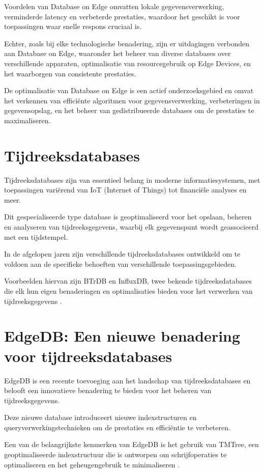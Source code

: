 Voordelen van Database on Edge omvatten lokale gegevensverwerking, verminderde latency en verbeterde prestaties, waardoor het geschikt is voor toepassingen waar snelle respons cruciaal is.

Echter, zoals bij elke technologische benadering, zijn er uitdagingen verbonden aan Database on Edge, waaronder het beheer van diverse databases over verschillende apparaten, optimalisatie van resourcegebruik op Edge Devices, en het waarborgen van consistente prestaties.

De optimalisatie van Database on Edge is een actief onderzoeksgebied en omvat het verkennen van efficiënte algoritmen voor gegevensverwerking, verbeteringen in gegevensopslag, en het beheer van gedistribueerde databases om de prestaties te maximaliseren.

\section{Tijdreeksdatabases}

Tijdreeksdatabases zijn van essentieel belang in moderne informatiesystemen, met toepassingen variërend van IoT (Internet of Things) tot financiële analyses en meer.

Dit gespecialiseerde type database is geoptimaliseerd voor het opslaan, beheren en analyseren van tijdreeksgegevens, waarbij elk gegevenspunt wordt geassocieerd met een tijdstempel. 

In de afgelopen jaren zijn verschillende tijdreeksdatabases ontwikkeld om te voldoen aan de specifieke behoeften van verschillende toepassingsgebieden.

Voorbeelden hiervan zijn BTrDB en InfluxDB, twee bekende tijdreeksdatabases die elk hun eigen benaderingen en optimalisaties bieden voor het verwerken van tijdreeksgegevens \autocite{Yang2019EdgeDBAE}.

\section{EdgeDB: Een nieuwe benadering voor tijdreeksdatabases}

EdgeDB is een recente toevoeging aan het landschap van tijdreeksdatabases en belooft een innovatieve benadering te bieden voor het beheren van tijdreeksgegevens.

Deze nieuwe database introduceert nieuwe indexstructuren en queryverwerkingstechnieken om de prestaties en efficiëntie te verbeteren.

Een van de belangrijkste kenmerken van EdgeDB is het gebruik van TMTree, een geoptimaliseerde indexstructuur die is ontworpen om schrijfoperaties te optimaliseren en het geheugengebruik te minimaliseren \autocite{Yang2019EdgeDBAE}.

